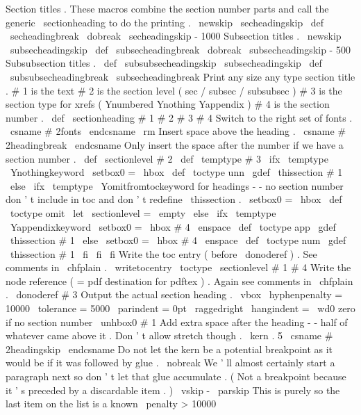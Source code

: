 {Section
titles
.
These
macros
combine
the
section
number
parts
and
%
call
the
generic
\
sectionheading
to
do
the
printing
.
%
\
newskip
\
secheadingskip
\
def
\
secheadingbreak
{
\
dobreak
\
secheadingskip
{
-
1000
}
}
%
Subsection
titles
.
\
newskip
\
subsecheadingskip
\
def
\
subsecheadingbreak
{
\
dobreak
\
subsecheadingskip
{
-
500
}
}
%
Subsubsection
titles
.
\
def
\
subsubsecheadingskip
{
\
subsecheadingskip
}
\
def
\
subsubsecheadingbreak
{
\
subsecheadingbreak
}
%
Print
any
size
any
type
section
title
.
%
%
#
1
is
the
text
#
2
is
the
section
level
(
sec
/
subsec
/
subsubsec
)
#
3
is
%
the
section
type
for
xrefs
(
Ynumbered
Ynothing
Yappendix
)
#
4
is
the
%
section
number
.
%
\
def
\
sectionheading
#
1
#
2
#
3
#
4
{
%
{
%
%
Switch
to
the
right
set
of
fonts
.
\
csname
#
2fonts
\
endcsname
\
rm
%
%
Insert
space
above
the
heading
.
\
csname
#
2headingbreak
\
endcsname
%
%
Only
insert
the
space
after
the
number
if
we
have
a
section
number
.
\
def
\
sectionlevel
{
#
2
}
%
\
def
\
temptype
{
#
3
}
%
%
\
ifx
\
temptype
\
Ynothingkeyword
\
setbox0
=
\
hbox
{
}
%
\
def
\
toctype
{
unn
}
%
\
gdef
\
thissection
{
#
1
}
%
\
else
\
ifx
\
temptype
\
Yomitfromtockeyword
%
for
headings
-
-
no
section
number
don
'
t
include
in
toc
%
and
don
'
t
redefine
\
thissection
.
\
setbox0
=
\
hbox
{
}
%
\
def
\
toctype
{
omit
}
%
\
let
\
sectionlevel
=
\
empty
\
else
\
ifx
\
temptype
\
Yappendixkeyword
\
setbox0
=
\
hbox
{
#
4
\
enspace
}
%
\
def
\
toctype
{
app
}
%
\
gdef
\
thissection
{
#
1
}
%
\
else
\
setbox0
=
\
hbox
{
#
4
\
enspace
}
%
\
def
\
toctype
{
num
}
%
\
gdef
\
thissection
{
#
1
}
%
\
fi
\
fi
\
fi
%
%
Write
the
toc
entry
(
before
\
donoderef
)
.
See
comments
in
\
chfplain
.
\
writetocentry
{
\
toctype
\
sectionlevel
}
{
#
1
}
{
#
4
}
%
%
%
Write
the
node
reference
(
=
pdf
destination
for
pdftex
)
.
%
Again
see
comments
in
\
chfplain
.
\
donoderef
{
#
3
}
%
%
%
Output
the
actual
section
heading
.
\
vbox
{
\
hyphenpenalty
=
10000
\
tolerance
=
5000
\
parindent
=
0pt
\
raggedright
\
hangindent
=
\
wd0
%
zero
if
no
section
number
\
unhbox0
#
1
}
%
}
%
%
Add
extra
space
after
the
heading
-
-
half
of
whatever
came
above
it
.
%
Don
'
t
allow
stretch
though
.
\
kern
.
5
\
csname
#
2headingskip
\
endcsname
%
%
Do
not
let
the
kern
be
a
potential
breakpoint
as
it
would
be
if
it
%
was
followed
by
glue
.
\
nobreak
%
%
We
'
ll
almost
certainly
start
a
paragraph
next
so
don
'
t
let
that
%
glue
accumulate
.
(
Not
a
breakpoint
because
it
'
s
preceded
by
a
%
discardable
item
.
)
\
vskip
-
\
parskip
%
%
This
is
purely
so
the
last
item
on
the
list
is
a
known
\
penalty
>
%
10000
}}
